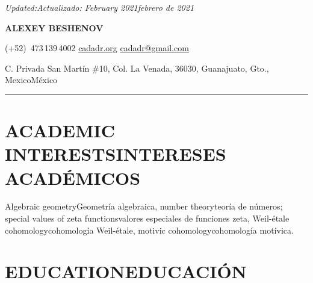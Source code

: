 \documentclass{article}
\newcommand{\biling}[2]{\ifdefined\english#1\fi\ifdefined\spanish#2\fi}
\begin{document}
{\flushright\noindent\emph{\biling{Updated:}{Actualizado:} \biling{February 2021}{febrero de 2021}}

}

\begin{center}
{\LARGE\sffamily\bf ALEXEY BESHENOV}

\vspace{0.5em}

\faPhoneSquare{} (+52)~473\,139\,4002 \quad
\faGlobe{} \href{https://cadadr.org/}{cadadr.org} \quad
\faEnvelope{} \href{mailto:cadadr@gmail.com}{cadadr@gmail.com} \\

\vspace{0.5em}

C. Privada San Martín \#10, Col. La Venada, 36030, Guanajuato, Gto., \biling{Mexico}{México}

\vspace{1em}

\rule{14cm}{1pt}

\end{center}

\vspace{1em}



{\color{RoyalBlue}\section*{\biling{ACADEMIC INTERESTS}{INTERESES ACADÉMICOS}}}

\biling{Algebraic geometry}{Geometría algebraica},
\biling{number theory}{teoría de números};
\biling{special values of zeta functions}{valores especiales de funciones zeta},
\biling{Weil-étale cohomology}{cohomología Weil-étale},
\biling{motivic cohomology}{cohomología motívica}.

\vspace{1em}

{\color{RoyalBlue}\section*{\biling{EDUCATION}{EDUCACIÓN}}}
\end{document}
